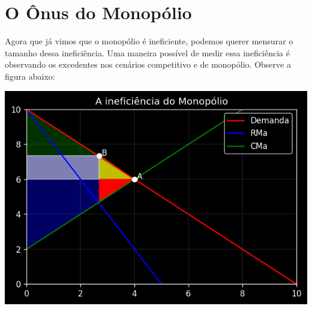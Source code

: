 \documentclass[a4paper,11pt,oneside]{book}
\theoremstyle{definition}
\theoremstyle{break}
\begin{document}
\section{O Ônus do Monopólio}

Agora que já vimos que o monopólio é ineficiente, podemos querer mensurar o tamanho dessa ineficiência. Uma maneira possível de medir essa ineficiência é observando os excedentes nos cenários competitivo e de monopólio. Observe a figura abaixo:

\begin{center}
\includegraphics[scale=0.8]{cap25_5-onus_monopolio.png}
\end{center}
\end{document}
